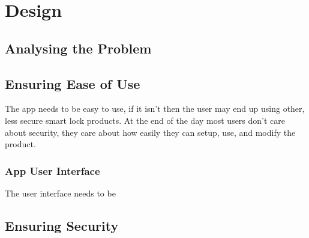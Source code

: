 \chapter{Design}
\label{chap:design}

\section{Analysing the Problem}


\section{Ensuring Ease of Use}
The app needs to be easy to use, if it isn't then the user may end up using other, less secure smart lock products. At the end of the day most users don't care about security, they care about how easily they can setup, use, and modify the product.

\subsection{App User Interface}
The user interface needs to be 

\section{Ensuring Security}


\section{}